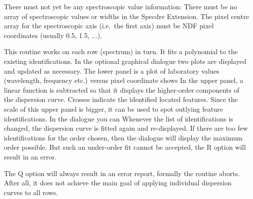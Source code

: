 {{      There must not yet be any spectroscopic value information: There
      must be no array of spectroscopic values or widths in the Specdre
      Extension. The pixel centre array for the spectroscopic axis
      (i.e.\ the first axis) must be NDF pixel coordinates (usually 0.5,
      1.5, ...).

      This routine works on each row (spectrum) in turn. It fits a
      polynomial to the existing identifications. In the optional
      graphical dialogue two plots are displayed and updated as
      necessary. The lower panel is a plot of laboratory values
      (wavelength, frequency etc.) versus pixel coordinate shows
      In the upper panel, a linear function is subtracted so that it
      displays the higher-order components of the dispersion curve.
      Crosses indicate the identified located features. Since the scale
      of this upper panel is bigger, it can be used to spot outlying
      feature identifications. In the dialogue you can
      Whenever the list of identifications is changed, the dispersion
      curve is fitted again and re-displayed. If there are too few
      identifications for the order chosen, then the dialogue will
      display the maximum order possible. But such an under-order fit
      cannot be accepted, the R option will result in an error.

      The Q option will always result in an error report, formally the
      routine aborts. After all, it does not achieve the main goal of
      applying individual dispersion curves to all rows.

}}
